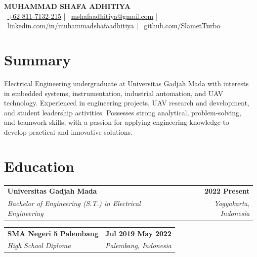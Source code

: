 \documentclass[a4paper,10pt]{article}
\makeatletter
\newcommand{\entry}[4]{%
  \begin{tabularx}{\linewidth}{@{}X r@{}}
    \textbf{#1} & \hspace{1em}\textbf{#4} \\
    \textit{#3} & \hspace{1em}\textit{\small #2} \\
  \end{tabularx}\par\vspace{1pt}%
}
\newcommand{\entrygap}{\vspace{6pt}}
\makeatother
\begin{document}
\begin{center}
  {\Huge\bfseries MUHAMMAD SHAFA ADHITIYA}\\[6pt]
  \footnotesize
  \faPhone*\ \href{tel:+628117132215}{+62 811-7132-215} \enspace|\enspace
  \faEnvelope\ \href{mailto:mshafaadhitiya@gmail.com}{mshafaadhitiya@gmail.com} \enspace|\enspace
  \faLinkedin\ \href{https://linkedin.com/in/muhammadshafaadhitiya}{linkedin.com/in/muhammadshafaadhitiya} \enspace|\enspace
  \faGithub\ \href{https://github.com/SlametTurbo}{github.com/SlametTurbo}
\end{center}

\section{Summary}
Electrical Engineering undergraduate at Universitas Gadjah Mada with interests in
embedded systems, instrumentation, industrial automation, and UAV technology.
Experienced in engineering projects, UAV research and development, and student
leadership activities. Possesses strong analytical, problem-solving, and teamwork
skills, with a passion for applying engineering knowledge to develop practical and
innovative solutions.

\section{Education}
\entry{Universitas Gadjah Mada}{Yogyakarta, Indonesia}
      {Bachelor of Engineering (S.T.) in Electrical Engineering}{2022 \textendash{} Present}
\entrygap
\entry{SMA Negeri 5 Palembang}{Palembang, Indonesia}
      {High School Diploma}{Jul 2019 \textendash{} May 2022}

\end{document}
